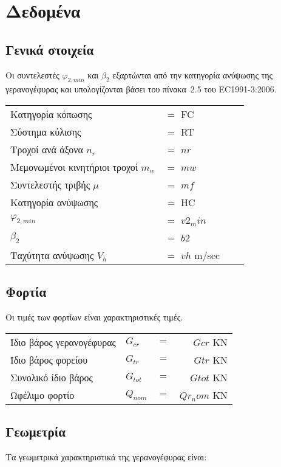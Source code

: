 \section{Δεδομένα}
\subsection{Γενικά στοιχεία}
Οι συντελεστές $φ_{2,min}$ και $β_2$ εξαρτώνται από την κατηγορία ανύψωσης της γερανογέφυρας και υπολογίζονται βάσει του πίνακα~2.5 του EC1991-3:2006.

\begin{tabular}{llcr}
    Κατηγορία κόπωσης                   &$=$ {{ FC }} \\
    Σύστημα κύλισης                     &$=$ {{ RT }}\\
    Τροχοί ανά άξονα    $n_r$           &$=$ ${{ nr }} $ \\
    Μεμονωμένοι κινητήριοι τροχοί $m_w$ &$=$ ${{ mw }}$ \\
    Συντελεστής τριβής $\mu$            &$=$ ${{ mf }}$ \\
    Κατηγορία ανύψωσης                  &$=$ {{ HC }} \\
    $φ_{2,min}$                         &$=$ ${{ v2_min }}$ \\
    $β_2$                               &$=$ ${{ b2 }}$ \\
    Ταχύτητα ανύψωσης  $V_h$            &$=$ ${{ vh }}$ m/sec
\end{tabular}

\subsection{Φορτία}
Οι τιμές των φορτίων είναι χαρακτηριστικές τιμές.

\begin{tabular}{llcr}
    Ίδιο βάρος γερανογέφυρας     & $G_{cr}$  &$=$ &${{ Gcr }}$ KN \\
    Ίδιο βάρος φορείου           & $G_{tr}$  &$=$ &${{ Gtr }}$ KN \\
    Συνολικό ίδιο βάρος          & $G_{tot}$ &$=$ &${{ Gtot }}$ KN \\
    Ωφέλιμο φορτίο               & $Q_{nom}$ &$=$ &${{ Qr_nom }}$ KN
\end{tabular}

\subsection{Γεωμετρία}
Τα γεωμετρικά χαρακτηριστικά της γερανογέφυρας είναι:

